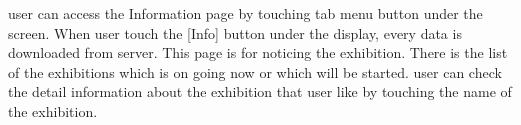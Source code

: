 \documentclass[conference]{IEEEtran}
\begin{document}
user can access the Information page by touching tab menu button under the screen. When user touch the [Info] button under the display, every data is downloaded from server. This page is for noticing the exhibition. There is the list of the exhibitions which is on going now or which will be started. user can check the detail information about the exhibition that user like by touching the name of the exhibition. \\\\\\\\\\\\\\\\\\\\\\\\\\\\
\end{document}
